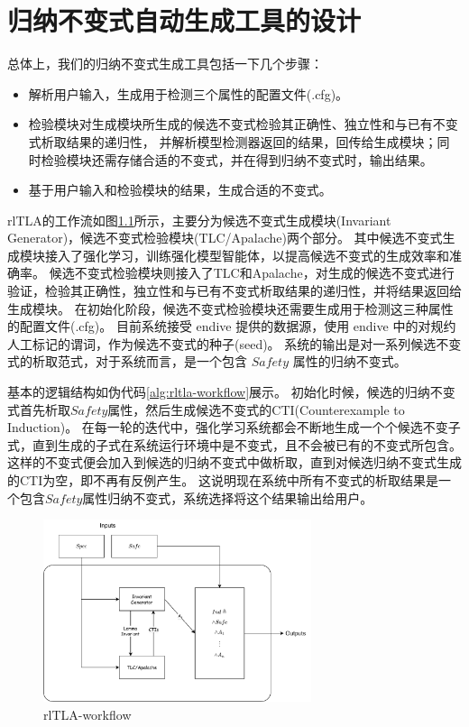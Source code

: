 \chapter{归纳不变式自动生成工具的设计}

总体上，我们的归纳不变式生成工具包括一下几个步骤：
\begin{itemize}
    \item 解析用户输入，生成用于检测三个属性的配置文件(.cfg)。
    \item 检验模块对生成模块所生成的候选不变式检验其正确性、独立性和与已有不变式析取结果的递归性，
    并解析模型检测器返回的结果，回传给生成模块；同时检验模块还需存储合适的不变式，并在得到归纳不变式时，输出结果。
    \item 基于用户输入和检验模块的结果，生成合适的不变式。
\end{itemize}

rlTLA的工作流如图\ref{fig:rltla}所示，主要分为候选不变式生成模块(Invariant Generator)，候选不变式检验模块(TLC/Apalache)两个部分。
其中候选不变式生成模块接入了强化学习，训练强化模型智能体，以提高候选不变式的生成效率和准确率。
候选不变式检验模块则接入了TLC和Apalache，对生成的候选不变式进行验证，检验其正确性，独立性和与已有不变式析取结果的递归性，并将结果返回给生成模块。
在初始化阶段，候选不变式检验模块还需要生成用于检测这三种属性的配置文件(.cfg)。
目前系统接受 endive 提供的数据源，使用 endive 中的对规约人工标记的谓词，作为候选不变式的种子(seed)。
系统的输出是对一系列候选不变式的析取范式，对于系统而言，是一个包含 $Safety$ 属性的归纳不变式。

基本的逻辑结构如伪代码\ref{alg:rltla-workflow}展示。
初始化时候，候选的归纳不变式首先析取$Safety$属性，然后生成候选不变式的CTI(Counterexample to Induction)。
在每一轮的迭代中，强化学习系统都会不断地生成一个个候选不变子式，直到生成的子式在系统运行环境中是不变式，且不会被已有的不变式所包含。
这样的不变式便会加入到候选的归纳不变式中做析取，直到对候选归纳不变式生成的CTI为空，即不再有反例产生。
这说明现在系统中所有不变式的析取结果是一个包含$Safety$属性归纳不变式，系统选择将这个结果输出给用户。


\begin{figure}
    \centering
    \includegraphics[width=0.7\textwidth]{figures/workflow.pdf}
    \caption{rlTLA-workflow}
    \label{fig:rltla}
\end{figure}

